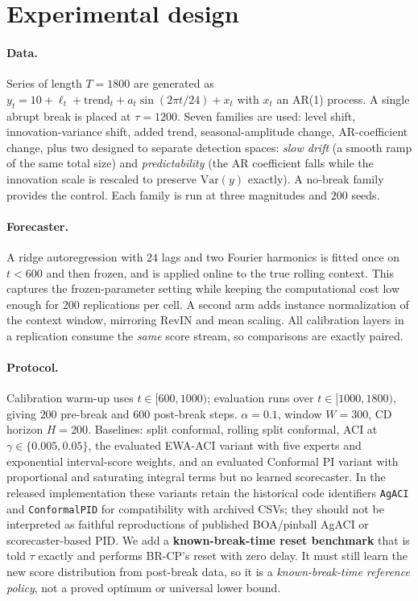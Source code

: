 \documentclass[10pt]{article}
\newcommand{\brcp}{\textsc{BR-CP}}
\begin{document}
\section{Experimental design}
\label{sec:design}

\paragraph{Data.} Series of length $T=1800$ are generated as
$y_t = 10 + \ell_t + \text{trend}_t + a_t\sin(2\pi t/24) + x_t$ with $x_t$ an
AR(1) process. A single abrupt break is placed at $\tau=1200$. Seven families
are used: level shift, innovation-variance shift, added trend,
seasonal-amplitude change, AR-coefficient change, plus two designed to separate detection spaces: \emph{slow drift} (a smooth ramp of the same total size)
and \emph{predictability} (the AR coefficient falls while the innovation scale
is rescaled to preserve $\mathrm{Var}(y)$ exactly). A no-break family provides
the control. Each family is run at three magnitudes and $200$ seeds.

\paragraph{Forecaster.} A ridge autoregression with $24$ lags and two Fourier
harmonics is fitted once on $t<600$ and then frozen, and is applied online to
the true rolling context. This captures the frozen-parameter setting while keeping the computational cost low enough for $200$ replications per cell. A second arm
adds instance normalization of the context window, mirroring RevIN and mean
scaling. All calibration layers in a replication consume the \emph{same}
score stream, so comparisons are exactly paired.

\paragraph{Protocol.} Calibration warm-up uses $t\in[600,1000)$; evaluation runs
over $t\in[1000,1800)$, giving $200$ pre-break and $600$ post-break steps.
$\alpha=0.1$, window $W=300$, $\mathrm{CD}$ horizon $H=200$. Baselines: split
conformal, rolling split conformal, ACI at $\gamma\in\{0.005,0.05\}$, the evaluated EWA-ACI variant with five experts and exponential interval-score weights, and an evaluated Conformal PI variant with proportional and saturating integral terms but no learned scorecaster. In the released implementation these variants retain the historical code identifiers \texttt{AgACI} and \texttt{ConformalPID} for compatibility with archived CSVs; they should not be interpreted as faithful reproductions of published BOA/pinball AgACI or scorecaster-based PID. We add a \textbf{known-break-time reset benchmark} that is
told $\tau$ exactly and performs \brcp{}'s reset with zero delay. It must still learn the new score distribution from post-break data, so it is a \emph{known-break-time reference policy}, not a proved optimum or universal lower bound.
\end{document}

